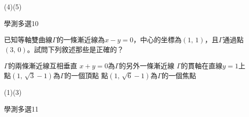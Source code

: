 \begin{QUESTIONS}
\begin{QUESTION}
\begin{QBODY}
        \end{QBODY}
        \begin{QFROMS}
        \end{QFROMS}
        \begin{QTAGS}\end{QTAGS}
        \begin{QANS}
            (4)(5)
        \end{QANS}
        \begin{QSOLLIST}
        \end{QSOLLIST}
        \begin{QEMPTYSPACE}
        \end{QEMPTYSPACE}
    \end{QUESTION}
    \begin{QUESTION}
        \begin{ExamInfo}{84}{學測}{多選}{10}
        \end{ExamInfo}
        \begin{ExamAnsRateInfo}{}{}{}{}
        \end{ExamAnsRateInfo}
        \begin{QBODY}
            	已知等軸雙曲線$\Gamma $的一條漸近線為$x-y=0$，中心的坐標為$\left( 1,\,1 \right)$，且$\Gamma $通過點$\left( 3,\,0 \right)$。試問下列敘述那些是正確的？
            \begin{QOPS}
            \QOP $\Gamma $的兩條漸近線互相垂直
            \QOP $x+y=0$為$\Gamma $的另外一條漸近線
            \QOP $\Gamma $的貫軸在直線$y=1$上
            \QOP 點$\left( 1,\,\sqrt{3}-1 \right)$為$\Gamma $的一個頂點
            \QOP 點$\left( 1,\,\sqrt{6}-1 \right)$為$\Gamma $的一個焦點
        \end{QOPS}
        \end{QBODY}
        \begin{QFROMS}
        \end{QFROMS}
        \begin{QTAGS}\end{QTAGS}
        \begin{QANS}
            (1)(3)
        \end{QANS}
        \begin{QSOLLIST}
        \end{QSOLLIST}
        \begin{QEMPTYSPACE}
        \end{QEMPTYSPACE}
    \end{QUESTION}
    \begin{QUESTION}
        \begin{ExamInfo}{84}{學測}{多選}{11}

\end{ExamInfo}
\end{QUESTION}
\end{QUESTIONS}
